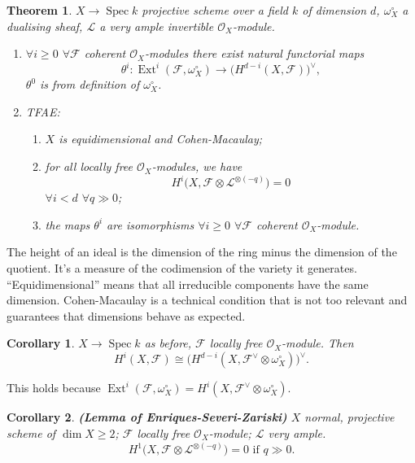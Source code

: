 \documentclass[12pt]{article}
\DeclareMathOperator{\Spec}{Spec}
\DeclareMathOperator{\Ext}{Ext}
\newtheorem*{theorem}{Theorem}
\newtheorem*{corollary}{Corollary}
\theoremstyle{definition}
\begin{document}
\begin{theorem}
$X\rightarrow\Spec k$ projective scheme over a field $k$ of dimension $d$, $\omega_X^{\circ}$ a dualising sheaf, $\mathcal{L}$ a very ample invertible $\mathcal{O}_X$-module.

\begin{enumerate}[label=\arabic*)]
\item $\forall i\geq0$ $\forall\mathcal{F}$ coherent $\mathcal{O}_X$-modules there exist natural functorial maps
\[\theta^i:\Ext^i(\mathcal{F},\omega_X^{\circ})\longrightarrow\big(H^{d-i}(X,\mathcal{F})\big)^{\vee},\]
$\theta^0$ is from definition of $\omega_X^{\circ}$.

\item TFAE:
\begin{enumerate}[label=\roman*)]
\item $X$ is equidimensional and Cohen-Macaulay;
\item for all locally free $\mathcal{O}_X$-modules, we have
\[H^i\big(X,\mathcal{F}\otimes\mathcal{L}^{\otimes(-q)}\big)=0\]
$\forall i<d$ $\forall q\gg0$;
\item the maps $\theta^i$ are isomorphisms $\forall i\geq0$ $\forall\mathcal{F}$ coherent $\mathcal{O}_X$-module.
\end{enumerate}
\end{enumerate}
\end{theorem}

The height of an ideal is the dimension of the ring minus the dimension of the quotient. It's a measure of the codimension of the variety it generates. ``Equidimensional'' means that all irreducible components have the same dimension. Cohen-Macaulay is a technical condition that is not too relevant and guarantees that dimensions behave as expected.

\begin{corollary}
$X\rightarrow\Spec k$ as before, $\mathcal{F}$ locally free $\mathcal{O}_X$-module. Then
\[H^i(X,\mathcal{F})\cong\big(H^{d-i}(X,\mathcal{F}^{\vee}\otimes\omega_X^{\circ})\big)^{\vee}.\]
\end{corollary}

This holds because $\Ext^i(\mathcal{F},\omega_X^{\circ})=H^i(X,\mathcal{F}^{\vee}\otimes\omega_X^{\circ})$.

\begin{corollary}
\emph{\textbf{(Lemma of Enriques-Severi-Zariski)}} $X$ normal, projective scheme of $\dim X\geq2$; $\mathcal{F}$ locally free $\mathcal{O}_X$-module; $\mathcal{L}$ very ample.
\[H^1\big(X,\mathcal{F}\otimes\mathcal{L}^{\otimes(-q)}\big)=0\text{ if }q\gg0.\]
\end{corollary}
\end{document}
